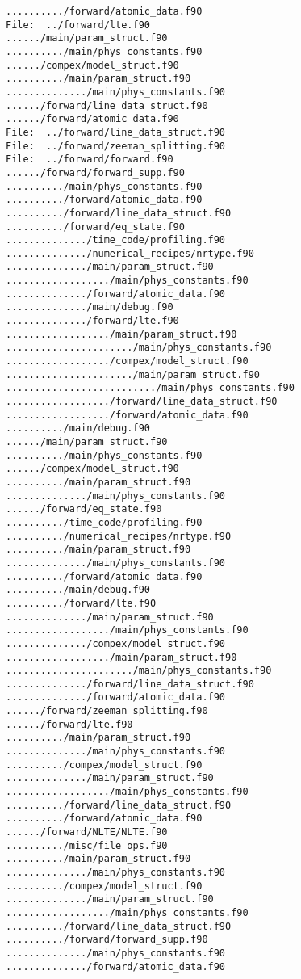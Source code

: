 \begin{verbatim}
........../forward/atomic_data.f90
File:  ../forward/lte.f90
....../main/param_struct.f90
........../main/phys_constants.f90
....../compex/model_struct.f90
........../main/param_struct.f90
............../main/phys_constants.f90
....../forward/line_data_struct.f90
....../forward/atomic_data.f90
File:  ../forward/line_data_struct.f90
File:  ../forward/zeeman_splitting.f90
File:  ../forward/forward.f90
....../forward/forward_supp.f90
........../main/phys_constants.f90
........../forward/atomic_data.f90
........../forward/line_data_struct.f90
........../forward/eq_state.f90
............../time_code/profiling.f90
............../numerical_recipes/nrtype.f90
............../main/param_struct.f90
................../main/phys_constants.f90
............../forward/atomic_data.f90
............../main/debug.f90
............../forward/lte.f90
................../main/param_struct.f90
....................../main/phys_constants.f90
................../compex/model_struct.f90
....................../main/param_struct.f90
........................../main/phys_constants.f90
................../forward/line_data_struct.f90
................../forward/atomic_data.f90
........../main/debug.f90
....../main/param_struct.f90
........../main/phys_constants.f90
....../compex/model_struct.f90
........../main/param_struct.f90
............../main/phys_constants.f90
....../forward/eq_state.f90
........../time_code/profiling.f90
........../numerical_recipes/nrtype.f90
........../main/param_struct.f90
............../main/phys_constants.f90
........../forward/atomic_data.f90
........../main/debug.f90
........../forward/lte.f90
............../main/param_struct.f90
................../main/phys_constants.f90
............../compex/model_struct.f90
................../main/param_struct.f90
....................../main/phys_constants.f90
............../forward/line_data_struct.f90
............../forward/atomic_data.f90
....../forward/zeeman_splitting.f90
....../forward/lte.f90
........../main/param_struct.f90
............../main/phys_constants.f90
........../compex/model_struct.f90
............../main/param_struct.f90
................../main/phys_constants.f90
........../forward/line_data_struct.f90
........../forward/atomic_data.f90
....../forward/NLTE/NLTE.f90
........../misc/file_ops.f90
........../main/param_struct.f90
............../main/phys_constants.f90
........../compex/model_struct.f90
............../main/param_struct.f90
................../main/phys_constants.f90
........../forward/line_data_struct.f90
........../forward/forward_supp.f90
............../main/phys_constants.f90
............../forward/atomic_data.f90

\end{verbatim}
